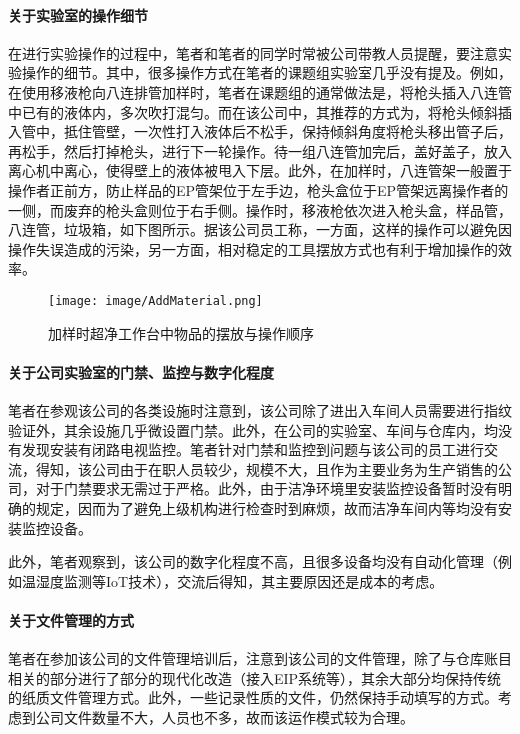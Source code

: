 \paragraph{关于实验室的操作细节} 在进行实验操作的过程中，笔者和笔者的同学时常被公司带教人员提醒，要注意实验操作的细节。其中，很多操作方式在笔者的课题组实验室几乎没有提及。例如，在使用移液枪向八连排管加样时，笔者在课题组的通常做法是，将枪头插入八连管中已有的液体内，多次吹打混匀。而在该公司中，其推荐的方式为，将枪头倾斜插入管中，抵住管壁，一次性打入液体后不松手，保持倾斜角度将枪头移出管子后，再松手，然后打掉枪头，进行下一轮操作。待一组八连管加完后，盖好盖子，放入离心机中离心，使得壁上的液体被甩入下层。此外，在加样时，八连管架一般置于操作者正前方，防止样品的EP管架位于左手边，枪头盒位于EP管架远离操作者的一侧，而废弃的枪头盒则位于右手侧。操作时，移液枪依次进入枪头盒，样品管，八连管，垃圾箱，如下图所示。据该公司员工称，一方面，这样的操作可以避免因操作失误造成的污染，另一方面，相对稳定的工具摆放方式也有利于增加操作的效率。

\begin{figure}[H]
    \centering
    \texttt{[image: image/AddMaterial.png]}
    \caption{加样时超净工作台中物品的摆放与操作顺序}
    \label{AM}
\end{figure}

\paragraph{}

\paragraph{关于公司实验室的门禁、监控与数字化程度} 笔者在参观该公司的各类设施时注意到，该公司除了进出入车间人员需要进行指纹验证外，其余设施几乎微设置门禁。此外，在公司的实验室、车间与仓库内，均没有发现安装有闭路电视监控。笔者针对门禁和监控到问题与该公司的员工进行交流，得知，该公司由于在职人员较少，规模不大，且作为主要业务为生产销售的公司，对于门禁要求无需过于严格。此外，由于洁净环境里安装监控设备暂时没有明确的规定，因而为了避免上级机构进行检查时到麻烦，故而洁净车间内等均没有安装监控设备。

此外，笔者观察到，该公司的数字化程度不高，且很多设备均没有自动化管理（例如温湿度监测等IoT技术），交流后得知，其主要原因还是成本的考虑。

\paragraph{关于文件管理的方式} 笔者在参加该公司的文件管理培训后，注意到该公司的文件管理，除了与仓库账目相关的部分进行了部分的现代化改造（接入EIP系统等），其余大部分均保持传统的纸质文件管理方式。此外，一些记录性质的文件，仍然保持手动填写的方式。考虑到公司文件数量不大，人员也不多，故而该运作模式较为合理。

